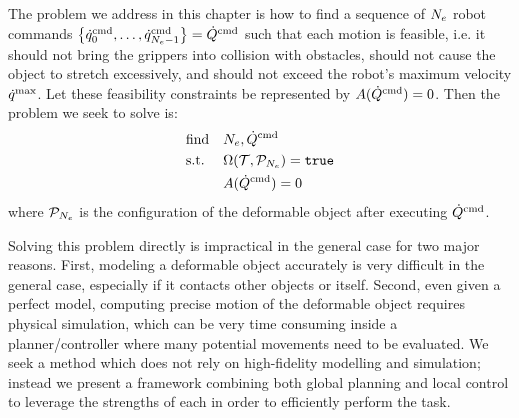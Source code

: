 The problem we address in this chapter is how to find a sequence of $N_e$ robot commands $\left\{ \dot{q}^{\textrm{cmd}}_0, \dots, \dot{q}^{\textrm{cmd}}_{N_e-1} \right\} = \dot Q^{\textrm{cmd}}$ such that each motion is feasible, i.e. it should not bring the grippers into collision with obstacles, should not cause the object to stretch excessively, and should not exceed the robot's maximum velocity $\dot{q}^\textrm{max}$. Let these feasibility constraints be represented by $A(\dot Q^{\textrm{cmd}}) = 0$. Then the problem we seek to solve is:
\begin{equation}
    \begin{aligned}
        & \text{find}   & & N_e, \dot Q^{\textrm{cmd}} \\
        & \text{s.t.}   & & \Omega(\mathcal{T}, \mathcal{P}_{N_e}) = \texttt{true}\\ 
        &               & & A(\dot Q^{\textrm{cmd}}) = 0\\
    \end{aligned}
    \label{eqn:veb_general_problem}
\end{equation}
where $\mathcal{P}_{N_e}$ is the configuration of the deformable object after executing $\dot Q^{\textrm{cmd}}$.

Solving this problem directly is impractical in the general case for two major reasons. First, modeling a deformable object accurately is very difficult in the general case, especially if it contacts other objects or itself. Second, even given a perfect model, computing precise motion of the deformable object requires physical simulation, which can be very time consuming inside a planner/controller where many potential movements need to be evaluated. We seek a method which does not rely on high-fidelity modelling and simulation; instead we present a framework combining both global planning and local control to leverage the strengths of each in order to efficiently perform the task.










